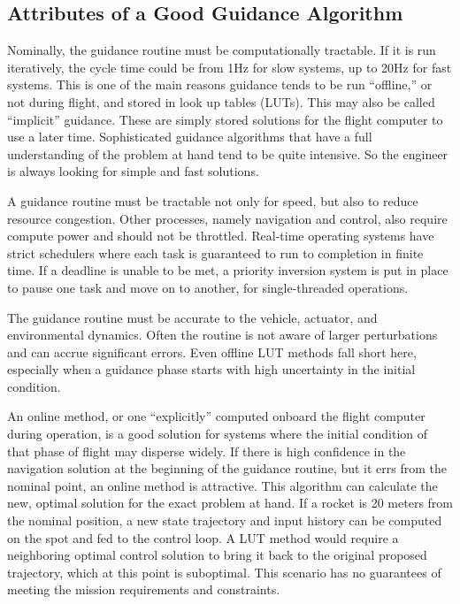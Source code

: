 \subsection{Attributes of a Good Guidance Algorithm}
Nominally, the guidance routine must be computationally tractable. If it is run iteratively, the cycle time could be from 1Hz for slow systems, up to 20Hz for fast systems. This is one of the main reasons guidance tends to be run ``offline,'' or not during flight, and stored in look up tables (LUTs). This may also be called ``implicit'' guidance. These are simply stored solutions for the flight computer to use a later time. Sophisticated guidance algorithms that have a full understanding of the problem at hand tend to be quite intensive. So the engineer is always looking for simple and fast solutions.

A guidance routine must be tractable not only for speed, but also to reduce resource congestion. Other processes, namely navigation and control, also require compute power and should not be throttled. Real-time operating systems have strict schedulers where each task is guaranteed to run to completion in finite time. If a deadline is unable to be met, a priority inversion system is put in place to pause one task and move on to another, for single-threaded operations.

The guidance routine must be accurate to the vehicle, actuator, and environmental dynamics. Often the routine is not aware of larger perturbations and can accrue significant errors. Even offline LUT methods fall short here, especially when a guidance phase starts with high uncertainty in the initial condition.

An online method, or one ``explicitly'' computed onboard the flight computer during operation, is a good solution for systems where the initial condition of that phase of flight may disperse widely. If there is high confidence in the navigation solution at the beginning of the guidance routine, but it errs from the nominal point, an online method is attractive. This algorithm can calculate the new, optimal solution for the exact problem at hand. If a rocket is 20 meters from the nominal position, a new state trajectory and input history can be computed on the spot and fed to the control loop. A LUT method would require a neighboring optimal control solution to bring it back to the original proposed trajectory, which at this point is suboptimal. This scenario has no guarantees of meeting the mission requirements and constraints.

